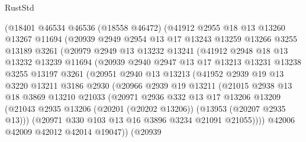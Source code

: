 \begin{lexlean}{RustStd}
\begin{coremodule}
          (@18401
            @46534
            @46536
            (@18558 @46472)
            (@41912
              @2955
              @18
              @13
              @13260
              @13267
              @11694
              (@20939
                @2949
                @2954
                @13
                @17
                @13243
                @13259
                @13266
                @3255
                @13189
                @3261
                (@20979
                  @2949
                  @13
                  @13232
                  @13241
                  (@41912
                    @2948
                    @18
                    @13
                    @13232
                    @13239
                    @11694
                    (@20939
                      @2940
                      @2947
                      @13
                      @17
                      @13213
                      @13231
                      @13238
                      @3255
                      @13197
                      @3261
                      (@20951
                        @2940
                        @13
                        @13213
                        (@41952
                          @2939
                          @19
                          @13
                          @3220
                          @13211
                          @3186
                          @2930
                          (@20966
                            @2939
                            @19
                            @13211
                            (@21015
                              @2938
                              @13
                              @18
                              @3869
                              @13210
                              @21033
                              (@20971
                                @2936
                                @332
                                @13
                                @17
                                @13206
                                @13209
                                (@21043
                                  @2935
                                  @13206
                                  (@20201 (@20202 @13206))
                                  (@13953 (@20207 @2935 @13)))
                                (@20971 @330 @103 @13 @16 @3896 @3234 @21091 @21055))))
                          @42006
                          @42009
                          @42012
                          @42014
                          @19047))
                      (@20939

\end{coremodule}
\end{lexlean}

